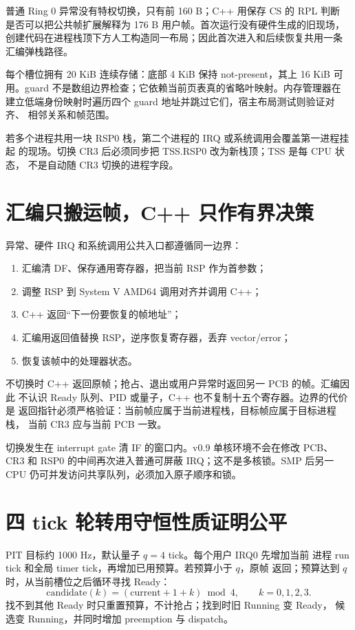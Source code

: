 普通 Ring 0 异常没有特权切换，只有前 160 B；C++ 用保存 CS 的 RPL 判断
是否可以把公共帧扩展解释为 176 B 用户帧。首次运行没有硬件生成的旧现场，
创建代码在进程栈顶下方人工构造同一布局；因此首次进入和后续恢复共用一条
汇编弹栈路径。

每个槽位拥有 20 KiB 连续存储：底部 4 KiB 保持 not-present，其上 16 KiB
可用。guard 不是数组边界检查；它依赖当前页表真的省略叶映射。内存管理器在
建立低端身份映射时遍历四个 guard 地址并跳过它们，宿主布局测试则验证对齐、
相邻关系和帧范围。

若多个进程共用一块 RSP0 栈，第二个进程的 IRQ 或系统调用会覆盖第一进程挂起
的现场。切换 CR3 后必须同步把 TSS.RSP0 改为新栈顶；TSS 是每 CPU 状态，
不是自动随 CR3 切换的进程字段。

\section{汇编只搬运帧，C++ 只作有界决策}

异常、硬件 IRQ 和系统调用公共入口都遵循同一边界：

\begin{enumerate}[label=\arabic*.]
  \item 汇编清 DF、保存通用寄存器，把当前 RSP 作为首参数；
  \item 调整 RSP 到 System V AMD64 调用对齐并调用 C++；
  \item C++ 返回“下一份要恢复的帧地址”；
  \item 汇编用返回值替换 RSP，逆序恢复寄存器，丢弃 vector/error；
  \item {} 恢复该帧中的处理器状态。
\end{enumerate}

不切换时 C++ 返回原帧；抢占、退出或用户异常时返回另一 PCB 的帧。汇编因此
不认识 Ready 队列、PID 或量子，C++ 也不复制十五个寄存器。边界的代价是
返回指针必须严格验证：当前帧应属于当前进程栈，目标帧应属于目标进程栈，
当前 CR3 应与当前 PCB 一致。

切换发生在 interrupt gate 清 IF 的窗口内。v0.9 单核环境不会在修改 PCB、
CR3 和 RSP0 的中间再次进入普通可屏蔽 IRQ；这不是多核锁。SMP 后另一 CPU
仍可并发访问共享队列，必须加入原子顺序和锁。

\section{四 tick 轮转用守恒性质证明公平}

PIT 目标约 1000 Hz，默认量子 \(q=4\) tick。每个用户 IRQ0 先增加当前
进程 run tick 和全局 timer tick，再增加已用预算。若预算小于 \(q\)，原帧
返回；预算达到 \(q\) 时，从当前槽位之后循环寻找 Ready：
\[
  \mathrm{candidate}(k) =
  (\mathrm{current}+1+k)\bmod 4,\qquad k=0,1,2,3.
\]
找不到其他 Ready 时只重置预算，不计抢占；找到时旧 Running 变 Ready，
候选变 Running，并同时增加 preemption 与 dispatch。

